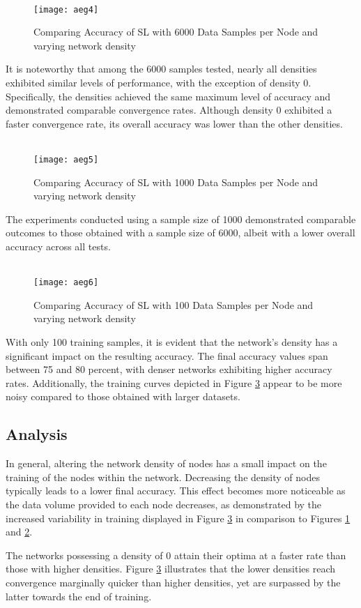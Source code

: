 \begin{figure}[H] 
	 \\
	\texttt{[image: aeg4]}
	\caption{Comparing Accuracy of SL with 6000 Data Samples per Node and varying network density}
	\label{aeg4}
\end{figure}

It is noteworthy that among the 6000 samples tested, nearly all densities exhibited similar levels of performance, with the exception of density 0. Specifically, the densities achieved the same maximum level of accuracy and demonstrated comparable convergence rates. Although density 0 exhibited a faster convergence rate, its overall accuracy was lower than the other densities.

\begin{figure}[H]
	 \\
	\texttt{[image: aeg5]}
	\caption{Comparing Accuracy of SL with 1000 Data Samples per Node and varying network density}
	\label{aeg5}
\end{figure}

The experiments conducted using a sample size of 1000 demonstrated comparable outcomes to those obtained with a sample size of 6000, albeit with a lower overall accuracy across all tests.

\begin{figure}[H]
	 \\
	\texttt{[image: aeg6]}
	\caption{Comparing Accuracy of SL with 100 Data Samples per Node and varying network density}
	\label{aeg6}
\end{figure}

With only 100 training samples, it is evident that the network's density has a significant impact on the resulting accuracy. The final accuracy values span between 75 and 80 percent, with denser networks exhibiting higher accuracy rates. Additionally, the training curves depicted in Figure \ref{aeg6} appear to be more noisy compared to those obtained with larger datasets.

\subsection{Analysis}
In general, altering the network density of nodes has a small impact on the training of the nodes within the network. Decreasing the density of nodes typically leads to a lower final accuracy. This effect becomes more noticeable as the data volume provided to each node decreases, as demonstrated by the increased variability in training displayed in Figure \ref{aeg6} in comparison to Figures \ref{aeg4} and \ref{aeg5}.

The networks possessing a density of 0 attain their optima at a faster rate than those with higher densities. Figure \ref{aeg6} illustrates that the lower densities reach convergence marginally quicker than higher densities, yet are surpassed by the latter towards the end of training.